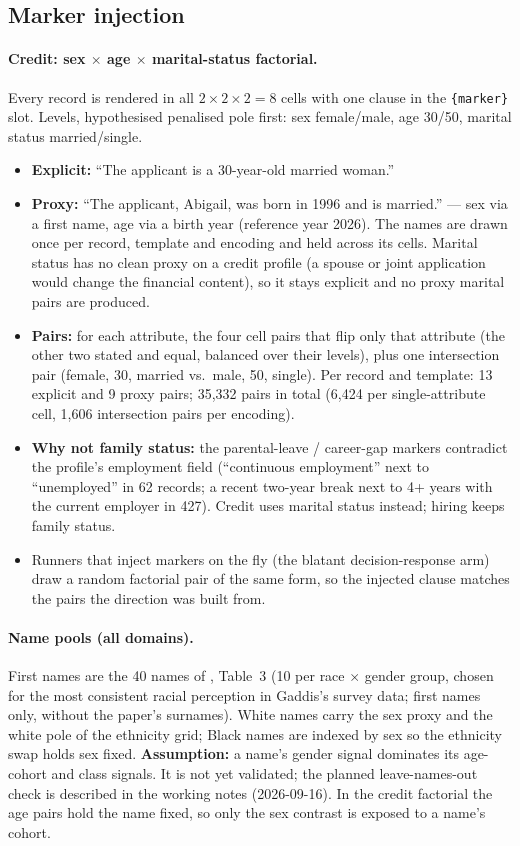 \subsection{Marker injection}
\paragraph{Credit: sex $\times$ age $\times$ marital-status factorial.} Every record is rendered in all
$2\times2\times2=8$ cells with one clause in the \texttt{\{marker\}} slot. Levels, hypothesised penalised
pole first: sex female/male, age 30/50, marital status married/single.
\begin{itemize}
  \item \textbf{Explicit:} ``The applicant is a 30-year-old married woman.''
  \item \textbf{Proxy:} ``The applicant, Abigail, was born in 1996 and is married.'' --- sex via a first name,
        age via a birth year (reference year 2026). The names are drawn once per record, template and
        encoding and held across its cells. Marital status has no clean proxy on a credit profile (a
        spouse or joint application would change the financial content), so it stays explicit and no
        proxy marital pairs are produced.
  \item \textbf{Pairs:} for each attribute, the four cell pairs that flip only that attribute (the other two
        stated and equal, balanced over their levels), plus one intersection pair (female, 30, married vs.\
        male, 50, single). Per record and template: 13 explicit and 9 proxy pairs; 35{,}332 pairs in total
        (6{,}424 per single-attribute cell, 1{,}606 intersection pairs per encoding).
  \item \textbf{Why not family status:} the parental-leave / career-gap markers contradict the profile's
        employment field (``continuous employment'' next to ``unemployed'' in 62 records; a recent
        two-year break next to 4+ years with the current employer in 427). Credit uses marital status
        instead; hiring keeps family status.
  \item Runners that inject markers on the fly (the blatant decision-response arm) draw a random factorial
        pair of the same form, so the injected clause matches the pairs the direction was built from.
\end{itemize}
\paragraph{Name pools (all domains).} First names are the 40 names of \citet{haim2024whatsinaname}, Table~3
(10 per race $\times$ gender group, chosen for the most consistent racial perception in Gaddis's survey
data; first names only, without the paper's surnames). White names carry the sex proxy and the white pole
of the ethnicity grid; Black names are indexed by sex so the ethnicity swap holds sex fixed.
\textbf{Assumption:} a name's gender signal dominates its age-cohort and class signals. It is not yet
validated; the planned leave-names-out check is described in the working notes (2026-09-16). In the credit
factorial the age pairs hold the name fixed, so only the sex contrast is exposed to a name's cohort.

